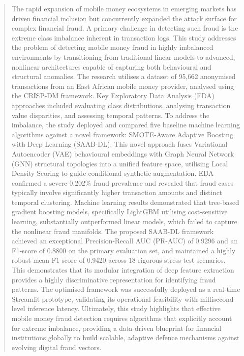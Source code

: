 \documentclass[a4paper,fleqn]{cas-sc}
\begin{document}
\begin{abstract}
The rapid expansion of mobile money ecosystems in emerging markets has driven financial inclusion but concurrently expanded the attack surface for complex financial fraud. A primary challenge in detecting such fraud is the extreme class imbalance inherent in transaction logs. This study addresses the problem of detecting mobile money fraud in highly imbalanced environments by transitioning from traditional linear models to advanced, nonlinear architectures capable of capturing both behavioural and structural anomalies. The research utilises a dataset of 95,662 anonymised transactions from an East African mobile money provider, analysed using the CRISP-DM framework. Key Exploratory Data Analysis (EDA) approaches included evaluating class distributions, analysing transaction value disparities, and assessing temporal patterns. To address the imbalance, the study deployed and compared five baseline machine learning algorithms against a novel framework: SMOTE-Aware Adaptive Boosting with Deep Learning (SAAB-DL). This novel approach fuses Variational Autoencoder (VAE) behavioural embeddings with Graph Neural Network (GNN) structural topologies into a unified feature space, utilising Local Density Scoring to guide conditional synthetic augmentation. EDA confirmed a severe 0.202\% fraud prevalence and revealed that fraud cases typically involve significantly higher transaction amounts and distinct temporal clustering. Machine learning results demonstrated that tree-based gradient boosting models, specifically LightGBM utilising cost-sensitive learning, substantially outperformed linear models, which failed to capture the nonlinear fraud manifolds. The proposed SAAB-DL framework achieved an exceptional Precision-Recall AUC (PR-AUC) of 0.9296 and an F1-score of 0.8800 on the primary evaluation set, and maintained a highly robust mean F1-score of 0.9420 across 18 rigorous stress-test scenarios. This demonstrates that its modular integration of deep feature extraction provides a highly discriminative representation for identifying fraud patterns. The optimised framework was successfully deployed as a real-time Streamlit prototype, validating its operational feasibility with millisecond-level inference latency. Ultimately, this study highlights that effective mobile money fraud detection requires algorithms that explicitly account for extreme imbalance, providing a data-driven blueprint for financial institutions globally to build scalable, adaptive defence mechanisms against evolving digital fraud vectors.
\end{abstract}
\end{document}
